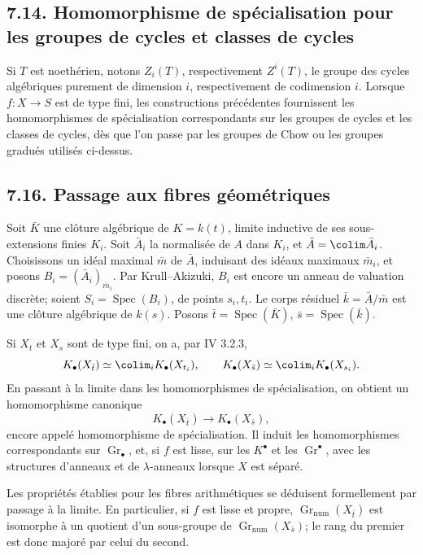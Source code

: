 \documentclass[11pt]{article}
\newcommand{\Gr}{\operatorname{Gr}}
\newcommand{\Spec}{\operatorname{Spec}}
\providecommand{\Gr}{\operatorname{Gr}}
\providecommand{\Gr}{\operatorname{G}}
\begin{document}
\subsection*{7.14. Homomorphisme de spécialisation pour les groupes de cycles et classes de cycles}
Si \(T\) est noethérien, notons \(Z_i(T)\), respectivement \(Z^i(T)\), le groupe des cycles algébriques purement de dimension \(i\), respectivement de codimension \(i\). Lorsque \(f:X\to S\) est de type fini, les constructions précédentes fournissent les homomorphismes de spécialisation correspondants sur les groupes de cycles et les classes de cycles, dès que l'on passe par les groupes de Chow ou les groupes gradués utilisés ci-dessus.

\subsection*{7.16. Passage aux fibres géométriques}
Soit \(\bar K\) une clôture algébrique de \(K=k(t)\), limite inductive de ses sous-extensions finies \(K_i\). Soit \(\bar A_i\) la normalisée de \(A\) dans \(K_i\), et \(\bar A=\colim \bar A_i\). Choisissons un idéal maximal \(\bar m\) de \(\bar A\), induisant des idéaux maximaux \(\bar m_i\), et posons \(B_i=(\bar A_i)_{\bar m_i}\). Par Krull--Akizuki, \(B_i\) est encore un anneau de valuation discrète; soient \(S_i=\Spec(B_i)\), de points \(s_i,t_i\). Le corps résiduel \(\bar k=\bar A/\bar m\) est une clôture algébrique de \(k(s)\). Posons \(\bar t=\Spec(\bar K)\), \(\bar s=\Spec(\bar k)\).

Si \(X_t\) et \(X_s\) sont de type fini, on a, par IV 3.2.3,
\[
  K_\bullet(X_{\bar t})\simeq \colim_i K_\bullet(X_{t_i}),
  \qquad
  K_\bullet(X_{\bar s})\simeq \colim_i K_\bullet(X_{s_i}).
\]
En passant à la limite dans les homomorphismes de spécialisation, on obtient un homomorphisme canonique
\begin{equation}\tag{7.16.1}
  K_\bullet(X_{\bar t})\longrightarrow K_\bullet(X_{\bar s}),
\end{equation}
encore appelé homomorphisme de spécialisation. Il induit les homomorphismes correspondants sur \(\Gr_\bullet\), et, si \(f\) est lisse, sur les \(K^\bullet\) et les \(\Gr^\bullet\), avec les structures d'anneaux et de \(\lambda\)-anneaux lorsque \(X\) est séparé.

Les propriétés établies pour les fibres arithmétiques se déduisent formellement par passage à la limite. En particulier, si \(f\) est lisse et propre, \(\Gr_{\mathrm{num}}(X_{\bar t})\) est isomorphe à un quotient d'un sous-groupe de \(\Gr_{\mathrm{num}}(X_{\bar s})\); le rang du premier est donc majoré par celui du second.
\end{document}
